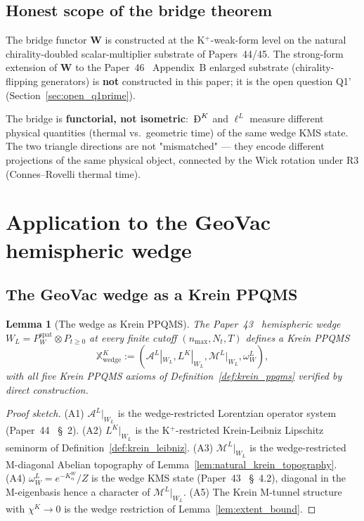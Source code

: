 \documentclass[11pt,a4paper]{article}
\theoremstyle{plain}
\newtheorem{lemma}[theorem]{Lemma}
\theoremstyle{definition}
\newcommand{\nmax}{n_{\max}}
\newcommand{\Nt}{N_{t}}
\newcommand{\Acal}{\mathcal{A}}
\newcommand{\Mcal}{\mathcal{M}}
\newcommand{\spat}{\mathrm{spat}}
\newcommand{\BigDeth}{\text{\DJ}^{K}}
\newcommand{\Wfun}{\mathbf{W}}
\newcommand{\BWvac}{\omega_{W}^{L}}
\newcommand{\Kalpha}{K_{\alpha}^{W}}
\begin{document}
\subsection{Honest scope of the bridge theorem}\label{sec:bridge_scope}

The bridge functor $\Wfun$ is constructed at the K$^{+}$-weak-form
level on the natural chirality-doubled scalar-multiplier substrate of
Papers~44/45. The strong-form extension of $\Wfun$ to the
Paper~46~\cite{paper46} Appendix~B enlarged substrate
(chirality-flipping generators) is \textbf{not} constructed in this
paper; it is the open question Q1' (Section~\ref{sec:open_q1prime}).

The bridge is \textbf{functorial, not isometric}:\ $\BigDeth$ and
$\ell^{L}$ measure different physical quantities (thermal vs.\
geometric time) of the same wedge KMS state. The two triangle
directions are not "mismatched" — they encode different projections
of the same physical object, connected by the Wick rotation under R3
(Connes--Rovelli thermal time).

\section{Application to the GeoVac hemispheric
wedge}\label{sec:wedge_application}

\subsection{The GeoVac wedge as a Krein PPQMS}\label{sec:wedge_as_krein_ppqms}

\begin{lemma}[The wedge as Krein PPQMS]\label{lem:wedge_as_krein_ppqms}
The Paper~43~\cite{paper43} hemispheric wedge $W_{L} = P_{W}^{\spat}
\otimes P_{t \ge 0}$ at every finite cutoff $(\nmax, \Nt, T)$ defines
a Krein PPQMS
\[
\mathbb{X}^{K}_{\mathrm{wedge}} := (\Acal^{L}|_{W_{L}},
L^{K}|_{W_{L}}, \Mcal^{L}|_{W_{L}}, \BWvac),
\]
with all five Krein PPQMS axioms of
Definition~\ref{def:krein_ppqms} verified by direct construction.
\end{lemma}

\begin{proof}[Proof sketch]
(A1) $\Acal^{L}|_{W_{L}}$ is the wedge-restricted Lorentzian operator
system (Paper~44~\cite{paper44} \S~2). (A2) $L^{K}|_{W_{L}}$ is the
K$^{+}$-restricted Krein-Leibniz Lipschitz seminorm of
Definition~\ref{def:krein_leibniz}. (A3) $\Mcal^{L}|_{W_{L}}$ is the
wedge-restricted M-diagonal Abelian topography of
Lemma~\ref{lem:natural_krein_topography}. (A4) $\BWvac =
e^{-\Kalpha}/Z$ is the wedge KMS state (Paper~43~\cite{paper43} \S~4.2),
diagonal in the M-eigenbasis hence a character of $\Mcal^{L}|_{W_{L}}$.
(A5) The Krein M-tunnel structure with $\chi^{K} \to 0$ is the wedge
restriction of Lemma~\ref{lem:extent_bound}.
\end{proof}
\end{document}
